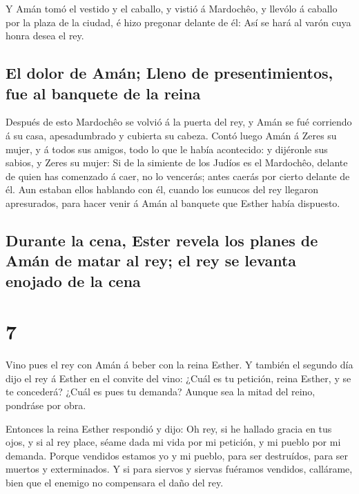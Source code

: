  Y Amán tomó el vestido y el caballo, y vistió á
Mardochêo, y llevólo á caballo por la plaza de la ciudad, é hizo
pregonar delante de él: Así se hará al varón cuya honra desea el rey.

\hypertarget{el-dolor-de-amuxe1n-lleno-de-presentimientos-fue-al-banquete-de-la-reina}{%
\subsection{El dolor de Amán; Lleno de presentimientos, fue al banquete
de la
reina}\label{el-dolor-de-amuxe1n-lleno-de-presentimientos-fue-al-banquete-de-la-reina}}

 Después de esto Mardochêo se volvió á la puerta del rey,
y Amán se fué corriendo á su casa, apesadumbrado y cubierta su cabeza.
 Contó luego Amán á Zeres su mujer, y á todos sus amigos,
todo lo que le había acontecido: y dijéronle sus sabios, y Zeres su
mujer: Si de la simiente de los Judíos es el Mardochêo, delante de quien
has comenzado á caer, no lo vencerás; antes caerás por cierto delante de
él.  Aun estaban ellos hablando con él, cuando los
eunucos del rey llegaron apresurados, para hacer venir á Amán al
banquete que Esther había dispuesto.

\hypertarget{durante-la-cena-ester-revela-los-planes-de-amuxe1n-de-matar-al-rey-el-rey-se-levanta-enojado-de-la-cena}{%
\subsection{Durante la cena, Ester revela los planes de Amán de matar al
rey; el rey se levanta enojado de la
cena}\label{durante-la-cena-ester-revela-los-planes-de-amuxe1n-de-matar-al-rey-el-rey-se-levanta-enojado-de-la-cena}}

\hypertarget{section-17-7}{%
\section{7}\label{section-17-7}}

 Vino pues el rey con Amán á beber con la reina Esther.
 Y también el segundo día dijo el rey á Esther en el
convite del vino: ¿Cuál es tu petición, reina Esther, y se te concederá?
¿Cuál es pues tu demanda? Aunque sea la mitad del reino, pondráse por
obra.

 Entonces la reina Esther respondió y dijo: Oh rey, si he
hallado gracia en tus ojos, y si al rey place, séame dada mi vida por mi
petición, y mi pueblo por mi demanda.  Porque vendidos
estamos yo y mi pueblo, para ser destruídos, para ser muertos y
exterminados. Y si para siervos y siervas fuéramos vendidos, callárame,
bien que el enemigo no compensara el daño del rey.

